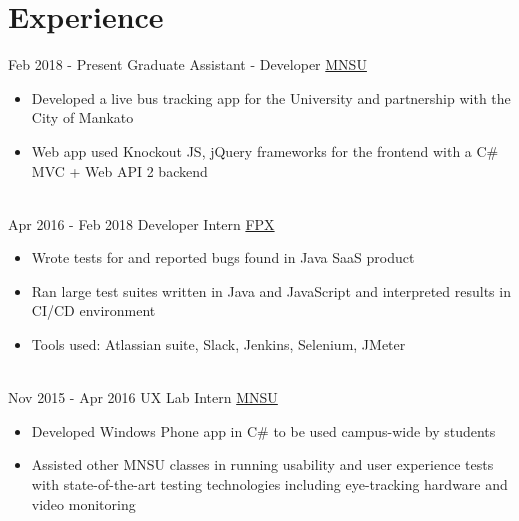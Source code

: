 \documentclass[letterpaper]{twentysecondcv} %
\begin{document}
\makeprofile %
 

\section{Experience}

\begin{twenty} %
\twentyitem
    	{Feb 2018 -}
		{Present}
        {Graduate Assistant - Developer}
        {\href{https://mankato.mnsu.edu/}{MNSU}}
        {}
        {\begin{itemize}
        \item Developed a live bus tracking app for the University and partnership with the City of Mankato
        \item Web app used Knockout JS, jQuery frameworks for the  frontend with a C\# MVC + Web API 2 backend
        \end{itemize}}
        \\
	\twentyitem
    	{Apr 2016 -}
		{Feb 2018}
        {Developer Intern}
        {\href{https://www.fpx.com}{FPX}}
        {}
        {
        {\begin{itemize}
        \item Wrote tests for and reported bugs found in Java SaaS product
        \item Ran large test suites written in Java and JavaScript and interpreted results in CI/CD environment
        \item Tools used: Atlassian suite, Slack, Jenkins, Selenium, JMeter
    \end{itemize}}
        }
    \\   
    \twentyitem
   		{Nov 2015 -}
		{Apr 2016}
        {UX Lab Intern}
        {\href{https://mankato.mnsu.edu/}{MNSU}}
        {}
        {
        {\begin{itemize}
        \item Developed Windows Phone app in C\# to be used campus-wide by students
        \item Assisted other MNSU classes in running usability and user experience tests with state-of-the-art testing technologies including eye-tracking hardware and video monitoring


\end{itemize}}}
\end{twenty}
\end{document}
